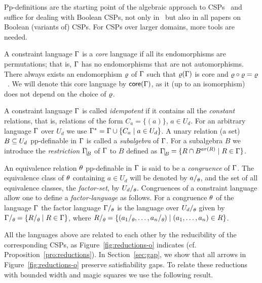 \smallskip

Pp-definitions are the starting point of the algebraic approach to
CSPs~\cite{Bulatov05:classifying} and suffice for dealing with Boolean CSPs,
not only in~\cite{AKS19:jcss} but also in all papers on Boolean (variants of) CSPs. For
CSPs over larger domains, more tools are needed.

A constraint language $\Gamma$ is a \emph{core} language if all its endomorphisms
are permutations; that is, $\Gamma$ has no endomorphisms that are not
automorphisms. There always exists an endomorphism $\varrho$ of $\Gamma$ such that $\varrho(\Gamma)$ is
core and $\varrho\circ\varrho=\varrho$~\cite{Bulatov05:classifying}. We will denote this core language by $\mathsf{core}(\Gamma)$, as it (up to an isomorphism) does not depend on the choice of $\varrho$.

A constraint language $\Gamma$ is called \emph{idempotent} if it contains all the
\emph{constant} relations, that is, relations of the form $C_a=\{(a)\}$, $a\in
U_d$. For an arbitrary language $\Gamma$ over $U_d$ we use $\Gamma^*=\Gamma\cup\{C_a\mid
a\in U_d\}$.  A unary relation (a set) $B\subseteq U_d$ pp-definable in $\Gamma$ is
called a \emph{subalgebra} of $\Gamma$. For a subalgebra $B$ we introduce the
\emph{restriction} $\Gm\red B$ of $\Gamma$ to $B$ defined as $\Gm\red B=\{\rel\cap
B^{ar(\rel)}\mid \rel\in\Gm\}$.

An equivalence relation $\theta$ pp-definable in $\Gamma$ is said to be a \emph{congruence} of $\Gamma$. The equivalence class of $\theta$ containing $a\in U_d$ will be denoted by $a\fac\th$, and the set of all equivalence classes, the \emph{factor-set}, by $U_d\fac\th$. Congruences of a constraint language allow one to define a \emph{factor-language} as follows. For a congruence $\theta$ of the language $\Gamma$ the factor language $\Gm\fac\th$ is the language over $U_d\fac\th$ given by $\Gm\fac\th=\{\rel\fac\th\mid \rel\in\Gm\}$, where $\rel\fac\th=\{(a_1\fac\th\zd a_n\fac\th)\mid  (\vc an)\in\rel\}$.

All the languages above are related to each other 
by the reducibility of the corresponding CSPs, as Figure~\ref{fig:reductions-o}
indicates (cf. Proposition~\ref{pro:reductions}).
%
In Section~\ref{sec:gap}, we show that all arrows in
Figure~\ref{fig:reductions-o} preserve satisfiability gaps.
%
To relate these reductions with bounded width and magic squares we use the
following result.

